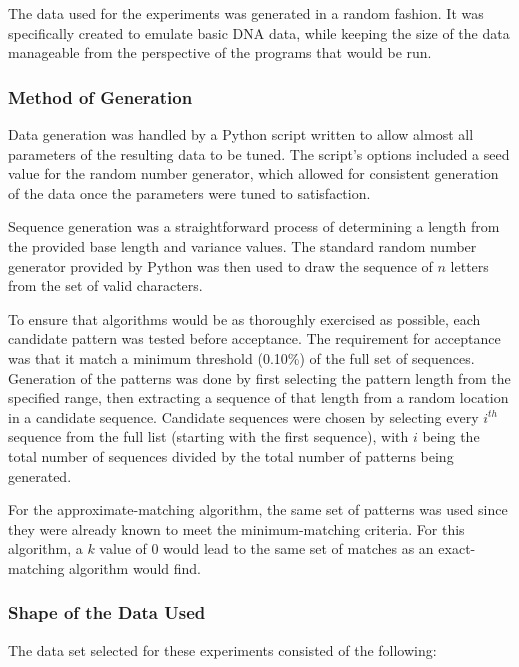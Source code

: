 The data used for the experiments was generated in a random fashion. It was specifically created to emulate basic DNA data, while keeping the size of the data manageable from the perspective of the programs that would be run.

\subsubsection{Method of Generation}

Data generation was handled by a Python script written to allow almost all parameters of the resulting data to be tuned. The script's options included a seed value for the random number generator, which allowed for consistent generation of the data once the parameters were tuned to satisfaction.

Sequence generation was a straightforward process of determining a length from the provided base length and variance values. The standard random number generator provided by Python was then used to draw the sequence of $n$ letters from the set of valid characters.

To ensure that algorithms would be as thoroughly exercised as possible, each candidate pattern was tested before acceptance. The requirement for acceptance was that it match a minimum threshold (0.10\%) of the full set of sequences. Generation of the patterns was done by first selecting the pattern length from the specified range, then extracting a sequence of that length from a random location in a candidate sequence. Candidate sequences were chosen by selecting every $i^{th}$ sequence from the full list (starting with the first sequence), with $i$ being the total number of sequences divided by the total number of patterns being generated.

For the approximate-matching algorithm, the same set of patterns was used since they were already known to meet the minimum-matching criteria. For this algorithm, a $k$ value of 0 would lead to the same set of matches as an exact-matching algorithm would find.

\subsubsection{Shape of the Data Used}

The data set selected for these experiments consisted of the following:

